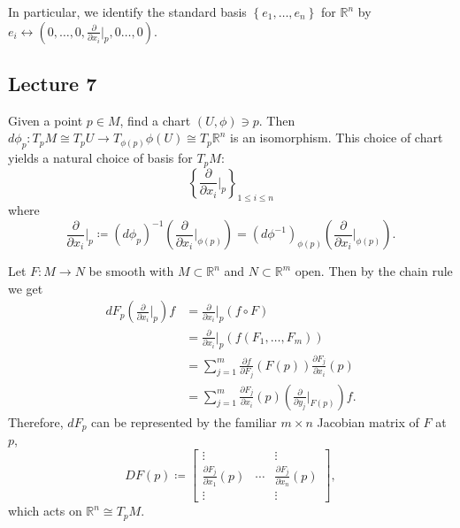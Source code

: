 \documentclass[10pt,letterpaper,cm]{nupset}
\theoremstyle{definition}
\theoremstyle{theorem}
\theoremstyle{remark}
\newcommand{\R}{\mathbb R}
\newcommand{\1}{\mathbf{1}}
\newcommand{\0}{\vec 0}
\begin{document}
In particular, we identify the standard basis $\left\{e_1, \ldots, e_n\right\}$ for $\R^n$ by $e_i \leftrightarrow \left(0, \ldots, 0, \frac{\partial}{\partial{x_i}}\bigr\rvert_p, 0 \ldots, 0\right)$.

\subsection{Lecture 7}


Given a point $p\in M$, find a chart $(U, \phi)\ni p$. Then $d\phi_p : T_pM \cong T_pU\to T_{\phi(p)}\phi(U) \cong T_p \R^n$ is an isomorphism. This choice of chart yields a natural choice of basis for $T_pM$: $$\left\{\frac{\partial}{\partial{x_i}}\bigr\rvert_{p} \right\}_{1\leq i \leq n}$$ where 
\[ \label{eqn:basis}
\frac{\partial}{\partial{x_i}}\bigr\rvert_{p}\coloneqq  \left(d\phi_p\right)^{-1}\left(\frac{\partial}{\partial{x_i}}\bigr\rvert_{\phi(p)}\right) = \left(d\phi^{-1}\right)_{\phi(p)}\left(\frac{\partial}{\partial{x_i}}\bigr\rvert_{\phi(p)}\right). \tag{$\ast$}
\]

\smallskip

Let $F: M \to N$ be smooth with $M\subset \R^n$ and $N \subset \R^m$ open. Then by the chain rule we get 
\begin{align*}
dF_p\left(\frac{\partial}{\partial{x_i}}\bigr\rvert_{p}\right)f & = \frac{\partial}{\partial{x_i}}\bigr\rvert_{p}(f \circ F) 
\\ & = \frac{\partial}{\partial{x_i}}\bigr\rvert_{p}(f(F_1, \ldots, F_m)) 
\\ & =\sum_{j=1}^m  \frac{\partial{f}}{\partial{F_j}}(F(p))\frac{\partial{F_j}}{\partial{x_i}}(p)
\\ & = \sum_{j=1}^m \frac{\partial{F_j}}{\partial{x_i}}(p) \left(\frac{\partial}{\partial{y_j}}\bigr\rvert_{F(p)}\right)f.
\end{align*} Therefore, $dF_p$ can be represented by the familiar $m\times n$ Jacobian matrix of $F$ at $p$, 
 $$DF(p) \coloneqq  \begin{bmatrix}  \vdots &  & \vdots \\ \frac{\partial{F_j}}{\partial{x_1}}(p)  & \cdots & \frac{\partial{F_j}}{\partial{x_n}}(p)  \\ \vdots & & \vdots  
\end{bmatrix},$$ which acts on $\R^n \cong T_pM$.
\end{document}
